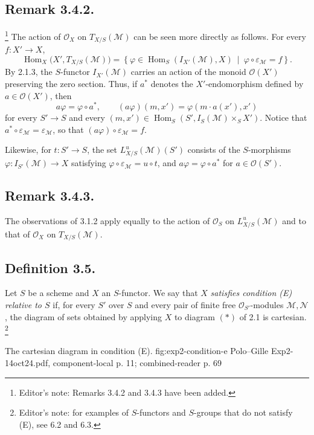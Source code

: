 \subsection*{Remark 3.4.2.}
\footnote{Editor's note: Remarks 3.4.2 and 3.4.3 have been added.}
The action of \(\mathcal O_X\) on \(T_{X/S}(\mathcal M)\) can be seen more
directly as follows. For every \(f:X'\to X\),
\[
  \operatorname{Hom}_X\bigl(X',T_{X/S}(\mathcal M)\bigr)
  =\left\{\varphi\in
    \operatorname{Hom}_S(I_{X'}(\mathcal M),X)
    \ \middle|\ \varphi\circ\varepsilon_{\mathcal M}=f\right\}.
\]
By 2.1.3, the \(S\)-functor \(I_{X'}(\mathcal M)\) carries an action of
the monoid \(\mathcal O(X')\) preserving the zero section. Thus, if
\(a^*\) denotes the \(X'\)-endomorphism defined by
\(a\in\mathcal O(X')\), then
\[
  a\varphi=\varphi\circ a^*,
  \qquad
  (a\varphi)(m,x')=\varphi(m\cdot a(x'),x')
\]
for every \(S'\to S\) and every
\((m,x')\in\operatorname{Hom}_S
  (S',I_S(\mathcal M)\times_S X')\). Notice that
\(a^*\circ\varepsilon_{\mathcal M}=\varepsilon_{\mathcal M}\), so that
\((a\varphi)\circ\varepsilon_{\mathcal M}=f\).

Likewise, for \(t:S'\to S\), the set
\(L^u_{X/S}(\mathcal M)(S')\) consists of the \(S\)-morphisms
\(\varphi:I_{S'}(\mathcal M)\to X\) satisfying
\(\varphi\circ\varepsilon_{\mathcal M}=u\circ t\), and
\(a\varphi=\varphi\circ a^*\) for \(a\in\mathcal O(S')\).

\subsection*{Remark 3.4.3.}
\footnotemark[21]
The observations of 3.1.2 apply equally to the action of \(\mathcal O_S\)
on \(L^u_{X/S}(\mathcal M)\) and to that of \(\mathcal O_X\) on
\(T_{X/S}(\mathcal M)\).

\subsection*{Definition 3.5.}
Let \(S\) be a scheme and \(X\) an \(S\)-functor. We say that \(X\)
\emph{satisfies condition (E) relative to \(S\)} if, for every \(S'\)
over \(S\) and every pair of finite free \(\mathcal O_{S'}\)-modules
\(\mathcal M,\mathcal N\), the diagram of sets obtained by applying \(X\)
to diagram \((*)\) of 2.1 is cartesian.
\footnote{Editor's note: for examples of \(S\)-functors and \(S\)-groups
that do not satisfy (E), see 6.2 and 6.3.}

  {The cartesian diagram in condition (E).}
  {fig:exp2-condition-e}
  {Polo--Gille Exp2-14oct24.pdf, component-local p. 11; combined-reader p. 69}

